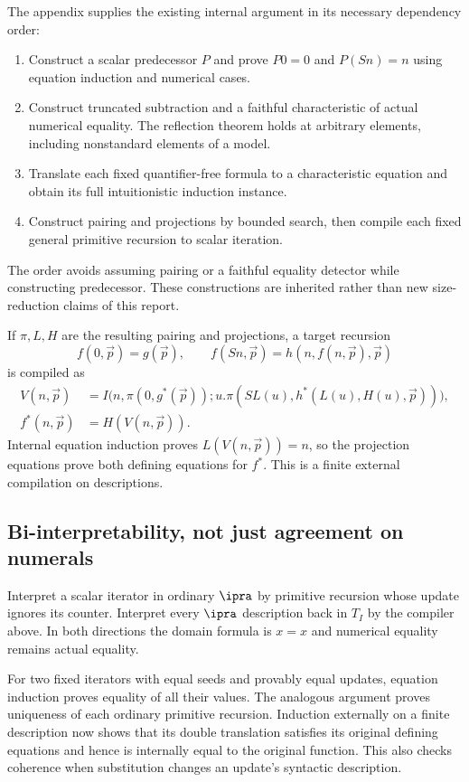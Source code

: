 The appendix supplies the existing internal argument in its necessary
dependency order:
\begin{enumerate}
\item Construct a scalar predecessor $P$ and prove $P0=0$ and
      $P(Sn)=n$ using equation induction and numerical cases.
\item Construct truncated subtraction and a faithful characteristic
      of actual numerical equality. The reflection theorem holds at
      arbitrary elements, including nonstandard elements of a model.
\item Translate each fixed quantifier-free formula to a characteristic
      equation and obtain its full intuitionistic induction instance.
\item Construct pairing and projections by bounded search, then compile
      each fixed general primitive recursion to scalar iteration.
\end{enumerate}
The order avoids assuming pairing or a faithful equality detector while
constructing predecessor. These constructions are inherited rather than
new size-reduction claims of this report.

If $\pi,L,H$ are the resulting pairing and projections, a target recursion
\[
 f(0,\vec p)=g(\vec p),\qquad
 f(Sn,\vec p)=h(n,f(n,\vec p),\vec p)
\]
is compiled as
\[
 \begin{split}
 V(n,\vec p)&=I\bigl(n,\pi(0,g^*(\vec p));
        u.\pi(SL(u),h^*(L(u),H(u),\vec p))\bigr),\\
 f^*(n,\vec p)&=H(V(n,\vec p)).
 \end{split}
\]
Internal equation induction proves $L(V(n,\vec p))=n$, so the projection
equations prove both defining equations for $f^*$. This is a finite
external compilation on descriptions.

\subsection{Bi-interpretability, not just agreement on numerals}

Interpret a scalar iterator in ordinary $\ipra$ by primitive recursion
whose update ignores its counter. Interpret every $\ipra$ description
back in $T_I$ by the compiler above. In both directions the domain
formula is $x=x$ and numerical equality remains actual equality.

For two fixed iterators with equal seeds and provably equal updates,
equation induction proves equality of all their values. The analogous
argument proves uniqueness of each ordinary primitive recursion.
Induction externally on a finite description now shows that its double
translation satisfies its original defining equations and hence is
internally equal to the original function. This also checks coherence
when substitution changes an update's syntactic description.

